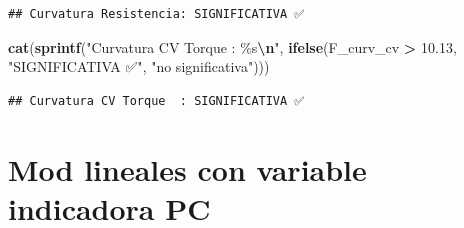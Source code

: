 \documentclass[
]{article}
\newenvironment{Shaded}{\begin{snugshade}}{\end{snugshade}}
\newcommand{\AttributeTok}[1]{\textcolor[rgb]{0.13,0.29,0.53}{#1}}
\newcommand{\CommentTok}[1]{\textcolor[rgb]{0.56,0.35,0.01}{\textit{#1}}}
\newcommand{\DecValTok}[1]{\textcolor[rgb]{0.00,0.00,0.81}{#1}}
\newcommand{\FloatTok}[1]{\textcolor[rgb]{0.00,0.00,0.81}{#1}}
\newcommand{\FunctionTok}[1]{\textcolor[rgb]{0.13,0.29,0.53}{\textbf{#1}}}
\newcommand{\NormalTok}[1]{#1}
\newcommand{\OtherTok}[1]{\textcolor[rgb]{0.56,0.35,0.01}{#1}}
\newcommand{\SpecialCharTok}[1]{\textcolor[rgb]{0.81,0.36,0.00}{\textbf{#1}}}
\newcommand{\StringTok}[1]{\textcolor[rgb]{0.31,0.60,0.02}{#1}}
\begin{document}
\begin{verbatim}
## Curvatura Resistencia: SIGNIFICATIVA ✅
\end{verbatim}

\begin{Shaded}
\begin{Highlighting}[]
\FunctionTok{cat}\NormalTok{(}\FunctionTok{sprintf}\NormalTok{(}\StringTok{"Curvatura CV Torque  : \%s}\SpecialCharTok{\textbackslash{}n}\StringTok{"}\NormalTok{,}
            \FunctionTok{ifelse}\NormalTok{(F\_curv\_cv  }\SpecialCharTok{\textgreater{}} \FloatTok{10.13}\NormalTok{, }\StringTok{"SIGNIFICATIVA ✅"}\NormalTok{, }\StringTok{"no significativa"}\NormalTok{)))}
\end{Highlighting}
\end{Shaded}

\begin{verbatim}
## Curvatura CV Torque  : SIGNIFICATIVA ✅
\end{verbatim}

\section{Mod lineales con variable indicadora
PC}\label{mod-lineales-con-variable-indicadora-pc}

\begin{Shaded}
\end{Shaded}
\end{document}
